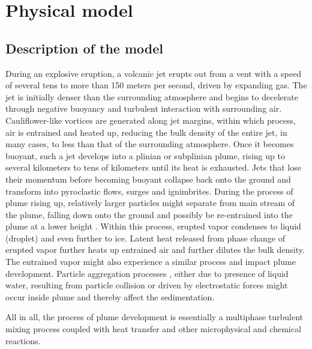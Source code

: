 \documentclass[gmd, manuscript]{copernicus}
\begin{document}
\section{Physical model} \label{sec:physics-model}
\subsection{Description of the model}
During an explosive eruption, a volcanic jet erupts out from a vent with a speed of several tens to more than 150 meters per second, driven by expanding gas. The jet is initially denser than the surrounding atmosphere and begins to decelerate through negative buoyancy and turbulent interaction with surrounding air. Cauliflower-like vortices are generated along jet margins, within which process, air is entrained and heated up, reducing the bulk density of the entire jet, in many cases, to less than that of the surrounding atmosphere. Once it becomes buoyant, such a jet develops into a plinian or subplinian plume, rising up to several kilometers to tens of kilometers until its heat is exhausted. Jets that lose their momentum before becoming buoyant collapse back onto the ground and transform into pyroclastic flows, surges and ignimbrites. During the process of plume rising up, relatively larger particles might separate from main stream of the plume, falling down onto the ground and possibly be re-entrained into the plume at a lower height \citep{ernst1996sedimentation}. Within this process, erupted vapor condenses to liquid (droplet) and even further to ice. Latent heat released from phase change of erupted vapor  further heats up entrained air and further dilutes the bulk density. The entrained vapor might also experience a similar process and impact plume development. Particle aggregation processes \citep{carey1982influence,taddeucci2011aggregation}, either due to presence of liquid water, resulting from particle collision or driven by electrostatic forces might occur inside plume and thereby affect the sedimentation. 

All in all, the process of plume development is  essentially a multiphase turbulent mixing process coupled with heat transfer and other microphysical and chemical reactions.
\end{document}
